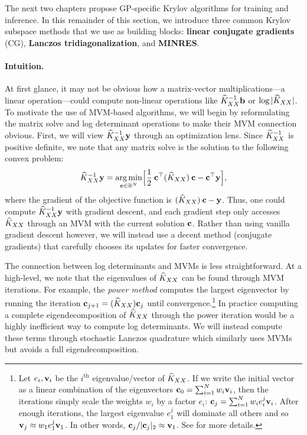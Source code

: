 The next two chapters propose GP-specific Krylov algorithms for training and inference.
In this remainder of this section, we introduce three common Krylov subspace methods that we use as building blocks: {\bf linear conjugate gradients} (CG), {\bf Lanczos tridiagonalization}, and {\bf MINRES}.

\paragraph{Intuition.}
At first glance, it may not be obvious how a matrix-vector multiplications---a linear operation---could compute non-linear operations like $\widehat{K}_{XX}^{-1} \mathbf{b}$ or $\log \vert \widehat{K}_{XX} \vert$.
To motivate the use of MVM-based algorithms, we will begin by reformulating the matrix solve and log determinant operations to make their MVM connection obvious.
First, we will view $\widehat{K}_{XX}^{-1} \mathbf{y}$ through an optimization lens.
Since $\widehat{K}_{XX}^{-1}$ is positive definite, we note that any matrix solve is the solution to the following convex problem:
%
\begin{equation}
  \widehat{K}_{XX}^{-1} \mathbf{y} = \operatorname*{arg\,min}_{\mathbf{c} \in \mathbb{R}^{N}} \Bigl[ \frac{1}{2} \: \mathbf{c}^\top (\widehat{K}_{XX}) \: \mathbf{c} - \mathbf{c}^\top \mathbf{y} \Bigr],
  \label{eqn:solve_as_optim}
\end{equation}
%
where the gradient of the objective function is $(\widehat{K}_{XX}) \: \mathbf{c} - \mathbf{y}$.
Thus, one could compute $\widehat{K}_{XX}^{-1} \mathbf{y}$ with gradient descent, and each gradient step only accesses $\widehat{K}_{XX}$ through an MVM with the current solution $\mathbf{c}$.
Rather than using vanilla gradient descent however, we will instead use a decent method (conjugate gradients) that carefully chooses its updates for faster convergence.

The connection between log determinants and MVMs is less straightforward.
At a high-level, we note that the eigenvalues of $\widehat{K}_{XX}$ can be found through MVM iterations.
For example, the \emph{power method} computes the largest eigenvector by running the iteration $\mathbf{c}_{j+1} = (\widehat{K}_{XX}) \mathbf{c}_{j}$ until convergence.\footnote{
  Let $e_i, \mathbf{v}_i$ be the $i^\text{th}$ eigenvalue/vector of $\widehat{K}_{XX}$.
  If we write the initial vector as a linear combination of the eigenvectors $\mathbf{c}_{0} = \sum_{i=1}^N w_i \mathbf{v}_i$, then the iterations simply scale the weights $w_i$ by a factor $e_i$:
  $\mathbf{c}_{j} = \sum_{i=1}^N w_i e_i^j \mathbf{v}_i$.
  After enough iterations, the largest eigenvalue $e_1^j$ will dominate all others and so $\mathbf{v}_{j} \approx w_1 e_1^j \mathbf{v}_1$.
  In other words, $\mathbf{c}_{j} / \vert \mathbf{c}_{j} \vert_2 \approx \mathbf{v}_1$.
  See \citep[e.g.][Ch. 8]{golub2012matrix} for more details.
}
In practice computing a complete eigendecomposition of $\widehat{K}_{XX}$ through the power iteration would be a highly inefficient way to compute log determinants.
We will instead compute these terms through stochastic Lanczos quadrature \citep{ubaru2017fast} which similarly uses MVMs but avoids a full eigendecomposition.

